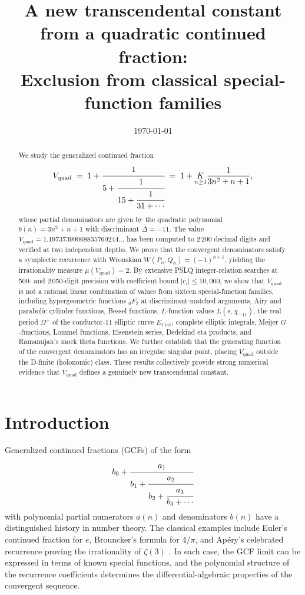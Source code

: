 \documentclass[11pt,a4paper]{article}
\title{A new transcendental constant from a quadratic continued fraction:\\
Exclusion from classical special-function families}
\author{}
\date{\today}
\theoremstyle{definition}
\theoremstyle{remark}
\newcommand{\Vq}{V_{\mathrm{quad}}}
\newcommand{\abs}[1]{\lvert #1 \rvert}
\begin{document}
\maketitle

\begin{abstract}
We study the generalized continued fraction
\[
  \Vq \;=\; 1 + \cfrac{1}{5 + \cfrac{1}{15 + \cfrac{1}{31 + \cdots}}}
  \;=\; 1 + \underset{n \ge 1}{K} \frac{1}{3n^2 + n + 1},
\]
whose partial denominators are given by the quadratic polynomial
$b(n) = 3n^2 + n + 1$ with discriminant $\Delta = -11$.
The value $\Vq = 1.19737399068835760244\ldots$ has been computed
to 2\,200 decimal digits and verified at two independent depths.
We prove that the convergent denominators satisfy a symplectic
recurrence with Wronskian $W(P_n, Q_n) = (-1)^{n+1}$, yielding the
irrationality measure $\mu(\Vq) = 2$.
By extensive PSLQ integer-relation searches at 500- and 2\,050-digit
precision with coefficient bound $\abs{c_i} \le 10{,}000$, we show
that $\Vq$ is not a rational linear combination of values from
sixteen special-function families, including hypergeometric functions
${}_0F_2$ at discriminant-matched arguments, Airy and parabolic
cylinder functions, Bessel functions, $L$-function values
$L(s, \chi_{-11})$, the real period $\Omega^+$ of the conductor-11
elliptic curve $E_{11a1}$, complete elliptic integrals, Meijer
$G$-functions, Lommel functions, Eisenstein series, Dedekind eta
products, and Ramanujan's mock theta functions.
We further establish that the generating function of the convergent
denominators has an irregular singular point, placing $\Vq$ outside
the D-finite (holonomic) class.
These results collectively provide strong numerical evidence that
$\Vq$ defines a genuinely new transcendental constant.
\end{abstract}


\section{Introduction}\label{sec:intro}

Generalized continued fractions (GCFs) of the form
\[
  b_0 + \cfrac{a_1}{b_1 + \cfrac{a_2}{b_2 + \cfrac{a_3}{b_3 + \cdots}}}
\]
with polynomial partial numerators $a(n)$ and denominators $b(n)$ have
a distinguished history in number theory.  The classical examples include
Euler's continued fraction for $e$, Brouncker's formula for $4/\pi$, and
Ap\'ery's celebrated recurrence proving the irrationality of $\zeta(3)$
\cite{apery1979}.  In each case, the GCF limit can be expressed in terms
of known special functions, and the polynomial structure of the
recurrence coefficients determines the differential-algebraic properties
of the convergent sequence.
\end{document}

